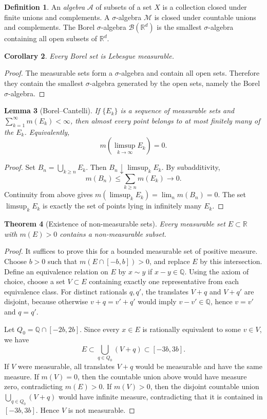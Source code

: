 \documentclass[11pt,openany]{book}
\numberwithin{equation}{chapter}
\theoremstyle{definition}
\newtheorem{definition}{Definition}[chapter]
\theoremstyle{plain}
\newtheorem{theorem}[definition]{Theorem}
\newtheorem{lemma}[definition]{Lemma}
\newtheorem{corollary}[definition]{Corollary}
\theoremstyle{remark}
\newcommand{\R}{\mathbb{R}}
\newcommand{\Q}{\mathbb{Q}}
\newcommand{\M}{\mathcal{M}}
\newcommand{\A}{\mathcal{A}}
\newcommand{\B}{\mathcal{B}}
\newcommand{\1}{\mathbf{1}}
\begin{document}
\begin{definition}
An \emph{algebra} \(\A\) of subsets of a set \(X\) is a collection closed under finite unions and complements.  A \(\sigma\)-algebra \(\M\) is closed under countable unions and complements.  The Borel \(\sigma\)-algebra \(\B(\R^d)\) is the smallest \(\sigma\)-algebra containing all open subsets of \(\R^d\).
\end{definition}

\begin{corollary}
Every Borel set is Lebesgue measurable.
\end{corollary}

\begin{proof}
The measurable sets form a \(\sigma\)-algebra and contain all open sets.  Therefore they contain the smallest \(\sigma\)-algebra generated by the open sets, namely the Borel \(\sigma\)-algebra.
\end{proof}

\begin{lemma}[Borel--Cantelli]
If \(\{E_k\}\) is a sequence of measurable sets and \(\sum_{k=1}^\infty m(E_k)<\infty\), then almost every point belongs to at most finitely many of the \(E_k\).  Equivalently,
\[
    m\left(\limsup_{k\to\infty}E_k\right)=0.
\]
\end{lemma}

\begin{proof}
Set \(B_n=\bigcup_{k\ge n}E_k\).  Then \(B_n\downarrow \limsup_kE_k\).  By subadditivity,
\[
    m(B_n)\le\sum_{k\ge n}m(E_k)\to0.
\]
Continuity from above gives \(m(\limsup_kE_k)=\lim_nm(B_n)=0\).  The set \(\limsup_kE_k\) is exactly the set of points lying in infinitely many \(E_k\).
\end{proof}

\begin{theorem}[Existence of non-measurable sets]
Every measurable set \(E\subset\R\) with \(m(E)>0\) contains a non-measurable subset.
\end{theorem}

\begin{proof}
It suffices to prove this for a bounded measurable set of positive measure.  Choose \(b>0\) such that \(m(E\cap[-b,b])>0\), and replace \(E\) by this intersection.  Define an equivalence relation on \(E\) by \(x\sim y\) if \(x-y\in\Q\).  Using the axiom of choice, choose a set \(V\subset E\) containing exactly one representative from each equivalence class.  For distinct rationals \(q,q'\), the translates \(V+q\) and \(V+q'\) are disjoint, because otherwise \(v+q=v'+q'\) would imply \(v-v'\in\Q\), hence \(v=v'\) and \(q=q'\).

Let \(Q_0=\Q\cap[-2b,2b]\).  Since every \(x\in E\) is rationally equivalent to some \(v\in V\), we have
\[
    E\subset\bigcup_{q\in Q_0}(V+q)\subset[-3b,3b].
\]
If \(V\) were measurable, all translates \(V+q\) would be measurable and have the same measure.  If \(m(V)=0\), then the countable union above would have measure zero, contradicting \(m(E)>0\).  If \(m(V)>0\), then the disjoint countable union \(\bigcup_{q\in Q_0}(V+q)\) would have infinite measure, contradicting that it is contained in \([-3b,3b]\).  Hence \(V\) is not measurable.
\end{proof}
\end{document}
